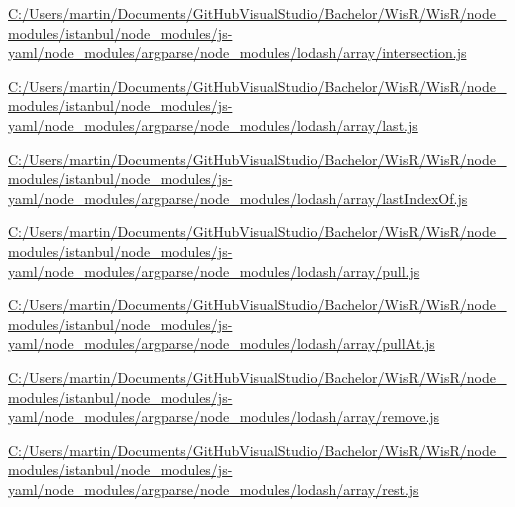 \begin{DoxyCompactItemize}
\item 
\hyperlink{_c_1_2_users_2martin_2_documents_2_git_hub_visual_studio_2_bachelor_2_wis_r_2_wis_r_2node_moduled6c8f8acb03d2be641773a33a65c7929}{C\+:/\+Users/martin/\+Documents/\+Git\+Hub\+Visual\+Studio/\+Bachelor/\+Wis\+R/\+Wis\+R/node\+\_\+modules/istanbul/node\+\_\+modules/js-\/yaml/node\+\_\+modules/argparse/node\+\_\+modules/lodash/array/intersection.\+js}
\item 
\hyperlink{_c_1_2_users_2martin_2_documents_2_git_hub_visual_studio_2_bachelor_2_wis_r_2_wis_r_2node_moduleeebccc0a732df170f45c01e0830cfbca}{C\+:/\+Users/martin/\+Documents/\+Git\+Hub\+Visual\+Studio/\+Bachelor/\+Wis\+R/\+Wis\+R/node\+\_\+modules/istanbul/node\+\_\+modules/js-\/yaml/node\+\_\+modules/argparse/node\+\_\+modules/lodash/array/last.\+js}
\item 
\hyperlink{_c_1_2_users_2martin_2_documents_2_git_hub_visual_studio_2_bachelor_2_wis_r_2_wis_r_2node_module8a0ffebb6b52ec463cc354dbe82730c3}{C\+:/\+Users/martin/\+Documents/\+Git\+Hub\+Visual\+Studio/\+Bachelor/\+Wis\+R/\+Wis\+R/node\+\_\+modules/istanbul/node\+\_\+modules/js-\/yaml/node\+\_\+modules/argparse/node\+\_\+modules/lodash/array/last\+Index\+Of.\+js}
\item 
\hyperlink{_c_1_2_users_2martin_2_documents_2_git_hub_visual_studio_2_bachelor_2_wis_r_2_wis_r_2node_module68da43de61aa0051b8d8b14070aeb995}{C\+:/\+Users/martin/\+Documents/\+Git\+Hub\+Visual\+Studio/\+Bachelor/\+Wis\+R/\+Wis\+R/node\+\_\+modules/istanbul/node\+\_\+modules/js-\/yaml/node\+\_\+modules/argparse/node\+\_\+modules/lodash/array/pull.\+js}
\item 
\hyperlink{_c_1_2_users_2martin_2_documents_2_git_hub_visual_studio_2_bachelor_2_wis_r_2_wis_r_2node_module0049ed8386dba79d0173ca1815b75768}{C\+:/\+Users/martin/\+Documents/\+Git\+Hub\+Visual\+Studio/\+Bachelor/\+Wis\+R/\+Wis\+R/node\+\_\+modules/istanbul/node\+\_\+modules/js-\/yaml/node\+\_\+modules/argparse/node\+\_\+modules/lodash/array/pull\+At.\+js}
\item 
\hyperlink{_c_1_2_users_2martin_2_documents_2_git_hub_visual_studio_2_bachelor_2_wis_r_2_wis_r_2node_module9b95b974e16fbfaf17479cefaa7a056f}{C\+:/\+Users/martin/\+Documents/\+Git\+Hub\+Visual\+Studio/\+Bachelor/\+Wis\+R/\+Wis\+R/node\+\_\+modules/istanbul/node\+\_\+modules/js-\/yaml/node\+\_\+modules/argparse/node\+\_\+modules/lodash/array/remove.\+js}
\item 
\hyperlink{_c_1_2_users_2martin_2_documents_2_git_hub_visual_studio_2_bachelor_2_wis_r_2_wis_r_2node_module32bf811be6a5874dc5b3753125406223}{C\+:/\+Users/martin/\+Documents/\+Git\+Hub\+Visual\+Studio/\+Bachelor/\+Wis\+R/\+Wis\+R/node\+\_\+modules/istanbul/node\+\_\+modules/js-\/yaml/node\+\_\+modules/argparse/node\+\_\+modules/lodash/array/rest.\+js}

\end{DoxyCompactItemize}
